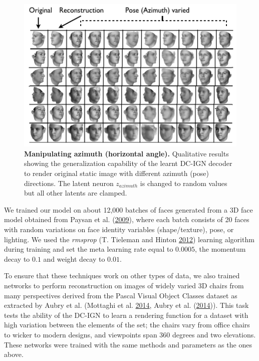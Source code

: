 \documentclass[12pt,twoside]{mitthesis}
\begin{document}
\begin{figure}[htbp]
\centering
\includegraphics{../figures/azvaried.png}
\caption{\textbf{Manipulating azimuth (horizontal angle).} Qualitative
results showing the generalization capability of the learnt DC-IGN
decoder to render original static image with different azimuth (pose)
directions. The latent neuron \(z_{azimuth}\) is changed to random
values but all other latents are clamped.}
\end{figure}

We trained our model on about 12,000 batches of faces generated from a
3D face model obtained from Paysan et al.
(\protect\hyperlink{ref-paysan2009face}{2009}), where each batch
consists of 20 faces with random variations on face identity variables
(shape/texture), pose, or lighting. We used the \emph{rmsprop} (T.
Tieleman and Hinton \protect\hyperlink{ref-rmsprop}{2012}) learning
algorithm during training and set the meta learning rate equal to
\(0.0005\), the momentum decay to \(0.1\) and weight decay to \(0.01\).

To ensure that these techniques work on other types of data, we also
trained networks to perform reconstruction on images of widely varied 3D
chairs from many perspectives derived from the Pascal Visual Object
Classes dataset as extracted by Aubry et al. (Mottaghi et al.
\protect\hyperlink{ref-mottaghi2014role}{2014}, Aubry et al.
(\protect\hyperlink{ref-aubry2014seeing}{2014})). This task tests the
ability of the DC-IGN to learn a rendering function for a dataset with
high variation between the elements of the set; the chairs vary from
office chairs to wicker to modern designs, and viewpoints span 360
degrees and two elevations. These networks were trained with the same
methods and parameters as the ones above.
\end{document}
